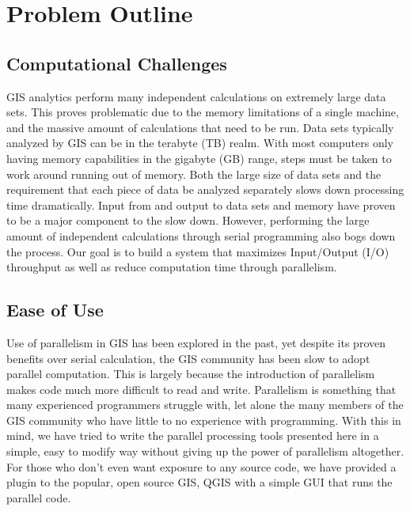 \documentclass[journal]{IEEEtran}
\begin{document}
\section{Problem Outline} \label{problem}
    \subsection{Computational Challenges}
    GIS analytics perform many independent calculations on extremely large data
    sets. This proves problematic due to the memory limitations of a single
    machine, and the massive amount of calculations that need to be run. Data sets 
    typically analyzed by GIS can be in the terabyte (TB) realm. With
    most computers only having memory capabilities in the gigabyte (GB) range,
    steps must be taken to work around running out of memory. Both the large size
    of data sets and the requirement that each piece of data be analyzed separately
    slows down processing time dramatically. Input from and output to data sets
    and memory have proven to be a major component to the slow down.  However,
    performing the large amount of independent calculations through serial
    programming also bogs down the process. Our goal is to build a system that
    maximizes Input/Output (I/O) throughput as well as reduce computation time
    through parallelism.

    \subsection{Ease of Use}
    Use of parallelism in GIS has been explored in the past, yet despite its proven
    benefits over serial calculation, the GIS community has been slow to adopt
    parallel computation. This is largely because the introduction of parallelism
    makes code much more difficult to read and write. Parallelism is something that
    many experienced programmers struggle with, let alone the many members of the
    GIS community who have little to no experience with programming. With this in
    mind, we have tried to write the parallel processing tools presented here in a
    simple, easy to modify way without giving up the power of parallelism
    altogether.  For those who don't even want exposure to any source code, we
    have provided a plugin to the popular, open source GIS, QGIS with a simple
    GUI that runs the parallel code.
\end{document}
